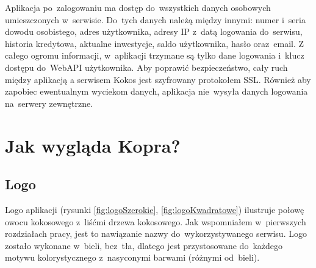 \documentclass[a4paper,twoside,titlepage,openright]{book}
\begin{document}
Aplikacja po~zalogowaniu ma dostęp do~wszystkich danych osobowych umieszczonych w~serwisie. Do~tych danych należą między innymi: numer i~seria dowodu osobistego, adres użytkownika, adresy IP z~datą logowania do~serwisu, historia kredytowa, aktualne inwestycje, saldo użytkownika, hasło oraz~email. Z całego ogromu informacji, w~aplikacji trzymane są tylko dane logowania i~klucz dostępu do~WebAPI użytkownika. Aby poprawić bezpieczeństwo, cały ruch między aplikacją a serwisem Kokos jest szyfrowany protokołem SSL. Również aby zapobiec ewentualnym wyciekom danych, aplikacja nie~wysyła danych logowania na~serwery zewnętrzne.

\section{Jak wygląda Kopra?}

\subsection{Logo}

Logo aplikacji (rysunki \ref{fig:logoSzerokie}, \ref{fig:logoKwadratowe}) ilustruje połowę owocu kokosowego z~liśćmi drzewa kokosowego. Jak wspomniałem w~pierwszych rozdziałach pracy, jest to nawiązanie nazwy do~wykorzystywanego serwisu. Logo zostało wykonane w~bieli, bez~tła, dlatego jest przystosowane do~każdego motywu kolorystycznego z~nasyconymi barwami (różnymi od~bieli).
\end{document}
